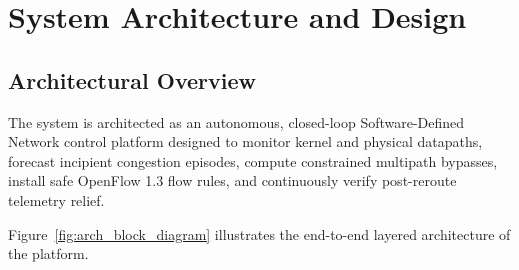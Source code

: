 \chapter{System Architecture and Design}
\label{ch:architecture}

\section{Architectural Overview}
The system is architected as an autonomous, closed-loop Software-Defined Network control platform designed to monitor kernel and physical datapaths, forecast incipient congestion episodes, compute constrained multipath bypasses, install safe OpenFlow 1.3 flow rules, and continuously verify post-reroute telemetry relief.

Figure~\ref{fig:arch_block_diagram} illustrates the end-to-end layered architecture of the platform.

